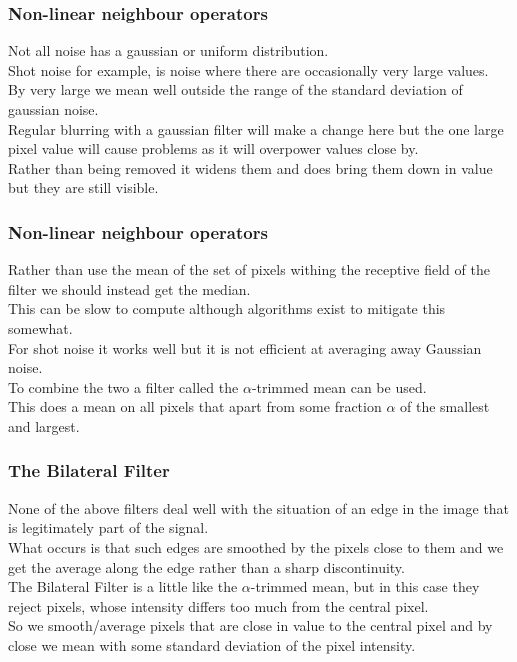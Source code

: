 \begin{frame}\frametitle{Non-linear neighbour operators}
Not all noise has a gaussian or uniform distribution.\\
Shot noise for example, is noise where there are occasionally very large values.\\
By very large we mean well outside the range of the standard deviation of gaussian noise.\\
Regular blurring with a gaussian filter will make a change here but the one large pixel value will cause problems as it will overpower values close by.\\
Rather than being removed it widens them and does bring them down in value but they are still visible.
\end{frame}

\begin{frame}\frametitle{Non-linear neighbour operators}
Rather than use the mean of the set of pixels withing the receptive field of the filter we should instead get the median.\\
This can be slow to compute although algorithms exist to mitigate this somewhat.\\
For shot noise it works well but it is not efficient at averaging away Gaussian noise.\\
To combine the two a filter called the $\alpha$-trimmed mean can be used.\\
This does a mean on all pixels that apart from some fraction $\alpha$ of the smallest and largest.
\end{frame}

\begin{frame}\frametitle{The Bilateral Filter }
None of the above filters deal well with the situation of an edge in the image that is legitimately part of the signal.\\
What occurs is that such edges are smoothed by the pixels close to them and we get the average along the edge rather than a sharp discontinuity.\\
The Bilateral Filter is a little like the $\alpha$-trimmed mean, but in this case they reject pixels, whose intensity differs too much from the central pixel.\\
So we smooth/average pixels that are close in value to the central pixel and by close we mean with some standard deviation of the pixel intensity.
\end{frame}

